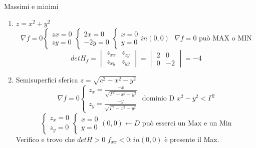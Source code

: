 \begin{esempio}
  Massimi e minimi
  \begin{enumerate}
  \item $z=x^2+y^2$
    \begin{equation*}
      \nabla f=0 \begin{cases}
                   zx=0\\
                   zy=0
                 \end{cases}\begin{cases}
                   2x=0\\
                   -2y=0
                 \end{cases}\begin{cases}
                   x=0\\
                   y=0
                 \end{cases} in (0,0)\text{ }\nabla f=0 \text{ può MAX o MIN}
    \end{equation*}
    \begin{equation*}
		det H_f=\begin{vmatrix}
			z_{xx} & z_{zy} \\
			z_{xy} & z_{yy}
		\end{vmatrix}=\begin{vmatrix}
			2 & 0 \\
			0 & -2
		\end{vmatrix} =-4
    \end{equation*}
    \item Semisuperfici sferica $z=\sqrt{c^2-x^2-y^2}$
		\begin{equation*}
			\nabla f=0 \begin{cases}
				z_x=\frac{-x}{\sqrt{\Gamma^2-x^2-y^2}}\\
				z_y=\frac{-y}{\sqrt{\Gamma^2-x^2-y^2}}
			\end{cases} \text{ dominio D } x^2-y^2<\Gamma^2 
		\end{equation*}
		\begin{equation*}
			\begin{cases}
				z_x=0\\
				z_y=0
			\end{cases}\begin{cases}
					x=0\\
					y=0
			\end{cases} (0,0)\leftarrow D \text{ può esserci un Max e un Min}
		\end{equation*}
		  Verifico e trovo che $det H>0$ $f_{xx}<0: in(0,0)$ è presente il Max.

\end{enumerate}
\end{esempio}

